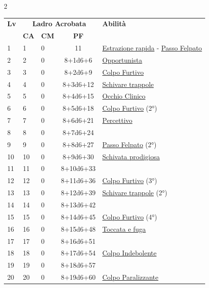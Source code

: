 {\begin{multicols}{2}

\noindent\begin{tabularx}{\linewidth}{p{0.55cm}|p{0.55cm}p{0.55cm}c|X|}
	\toprule
 \rowcolor{gray!20}	\textbf{Lv} & \multicolumn{3}{c|}{\textbf{Ladro Acrobata}} & \textbf{Abilità} \\
& \centering\arraybackslash \textbf{CA} & \centering\arraybackslash \textbf{CM} & \centering\arraybackslash \textbf{PF} & \\
	\toprule
	1 & 1 & 0 & 11 & \hyperlink{Estrazione rapida}{Estrazione rapida} - \hyperlink{Passo Felpato}{Passo Felpato}\\
	\rowcolor{gray!20}2 & 2 & 0 & 8+1d6+6 & \hyperlink{Opportunista}{Opportunista}\\
	3 & 3 & 0 & 8+2d6+9 & \hyperlink{Colpo Furtivo}{Colpo Furtivo}\\
	\rowcolor{gray!20}4 & 4 & 0 & 8+3d6+12 & \hyperlink{Schivare trappole}{Schivare trappole}\\
	5 & 5 & 0 & 8+4d6+15 & \hyperlink{Occhio Clinico}{Occhio Clinico}\\
	\rowcolor{gray!20}6 & 6 & 0 & 8+5d6+18 & \hyperlink{Colpo Furtivo}{Colpo Furtivo} (2°)\\
	7 & 7 & 0 & 8+6d6+21 & \hyperlink{Percettivo}{Percettivo}\\
	\rowcolor{gray!20}8 & 8 & 0 & 8+7d6+24 & \\
	9 & 9 & 0 & 8+8d6+27 & \hyperlink{Passo Felpato}{Passo Felpato} (2°)\\
	\rowcolor{gray!20}10 & 10 & 0 & 8+9d6+30 & \hyperlink{Schivata prodigiosa}{Schivata prodigiosa}\\
	11 & 11 & 0 & 8+10d6+33 & \\
	\rowcolor{gray!20}12 & 12 & 0 & 8+11d6+36 & \hyperlink{Colpo Furtivo}{Colpo Furtivo} (3°)\\
	13 & 13 & 0 & 8+12d6+39 & \hyperlink{Schivare trappole}{Schivare trappole} (2°)\\
	\rowcolor{gray!20}14 & 14 & 0 & 8+13d6+42 & \\
	15 & 15 & 0 & 8+14d6+45 & \hyperlink{Colpo Furtivo}{Colpo Furtivo} (4°)\\
	\rowcolor{gray!20}16 & 16 & 0 & 8+15d6+48 & \hyperlink{Toccata e fuga}{Toccata e fuga}\\
	17 & 17 & 0 & 8+16d6+51 & \\
	\rowcolor{gray!20}18 & 18 & 0 & 8+17d6+54 & \hyperlink{Colpo Indebolente}{Colpo Indebolente}\\
	19 & 19 & 0 & 8+18d6+57 & \\
	\rowcolor{gray!20}20 & 20 & 0 & 8+19d6+60 & \hyperlink{Colpo Paralizzante}{Colpo Paralizzante}\\
\end{tabularx}


\end{multicols}}
